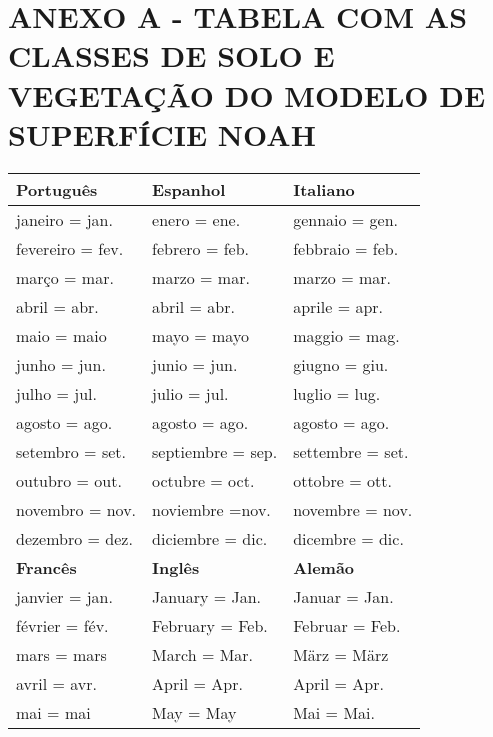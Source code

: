 \hypertarget{estilo:anexo}{}

\chapter{ANEXO A - TABELA COM AS CLASSES DE SOLO E VEGETAÇÃO DO MODELO DE SUPERFÍCIE NOAH}
\label{anexoA}

\begin{table}[!h]
 \label{tab:abreviaturas}
  \begin{center}
 	\begin{tabular}{lll}
	 \hline
	  \textbf{Português}    & \textbf{Espanhol}  & \textbf{Italiano}\\ 
   \hline
       janeiro   = jan.   & enero = ene.       & gennaio = gen.\\
       fevereiro = fev.   & febrero = feb.     & febbraio = feb.\\
       março     = mar.   & marzo = mar.       & marzo = mar.\\
       abril     = abr.   & abril = abr.       & aprile = apr.\\
       maio      = maio   & mayo = mayo        & maggio = mag.\\ 
       junho     = jun.   & junio = jun.       & giugno = giu.\\ 
       julho     = jul.   & julio = jul.       & luglio = lug.\\
       agosto    = ago.   & agosto = ago.      & agosto = ago.\\
       setembro  = set.   & septiembre = sep.  & settembre = set.\\
       outubro   = out.   & octubre = oct.     & ottobre = ott.\\
       novembro  = nov.   & noviembre =nov.    & novembre = nov.\\
       dezembro  = dez.   & diciembre = dic.   & dicembre = dic.\\ 
     \hline
   \textbf{Francês}       & \textbf{Inglês}    & \textbf{Alemão}\\
     \hline
       janvier = jan.     & January = Jan.     & Januar = Jan.\\
       février = fév.     & February = Feb.    & Februar = Feb.\\
       mars = mars        & March = Mar.       & März = März\\
       avril = avr.       & April = Apr.       & April = Apr.\\
       mai = mai          & May = May          & Mai = Mai.\\

\end{tabular}
\end{center}
\end{table}
